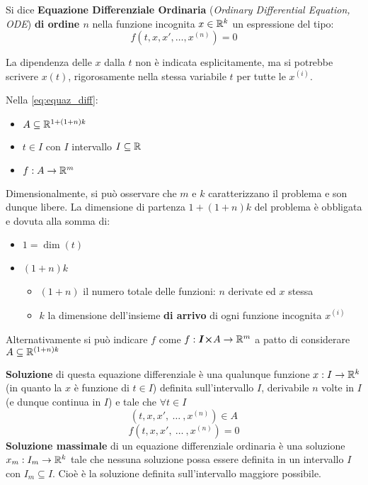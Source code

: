 \begin{definition}
	\label{def:equaz_diff}
	Si dice \textbf{Equazione Differenziale Ordinaria} (\textit{Ordinary Differential Equation, ODE}) \textbf{di ordine $n$} nella funzione incognita $x\in \mathbb{R}^k$ un espressione del tipo:
	\begin{equation}
		\label{eq:equaz_diff}
		f(t,x, x',\ldots,x^{(n)})=0
	\end{equation}
	\begin{note}
		La dipendenza delle $x$ dalla $t$ non è indicata esplicitamente, ma si potrebbe scrivere $x(t)$, rigorosamente nella stessa variabile $t$ per tutte le $x^{(i)}$.
	\end{note}
	Nella \cref{eq:equaz_diff}:
	\begin{itemize}[noitemsep]
		\item $A\subseteq \mathbb{R}^{1+(1+n)k}$
		\item $t\in I$ con $I$ intervallo $I \subseteq \mathbb{R}$
		\item $f: A \to \mathbb{R}^m$
	\end{itemize}
	Dimensionalmente, si può osservare che $m$ e $k$ caratterizzano il problema e son dunque libere. La dimensione di partenza $1+(1+n)k$ del problema è obbligata e dovuta alla somma di:
	\begin{itemize}[noitemsep]
		\item $1 = \dim(t)$
		\item $(1+n)k$
		\begin{itemize}[noitemsep]
			\item $(1+n)$ il numero totale delle funzioni: $n$ derivate ed $x$ stessa
			\item $k$ la dimensione dell'insieme \textbf{di arrivo} di ogni funzione incognita $x^{(i)}$
		\end{itemize}
	\end{itemize}
	\begin{note}
		Alternativamente si può indicare $f$ come $f: \boldsymbol{I \times} A \to \mathbb{R}^m$ a patto di considerare $A\subseteq \mathbb{R}^{(1+n)k}$
	\end{note}
	\textbf{Soluzione} di questa equazione differenziale è una qualunque funzione $x:I\to \mathbb{R}^k$ (in quanto la $x$ è funzione di $t \in I$) definita sull'intervallo $I$, derivabile $n$ volte in $I$ (e dunque continua in $I$) e tale che $\forall t\in I$
	\[(t,x, x',\:\dotsc\:,x^{(n)}) \in A\]
	\[f(t,x, x',\:\dotsc\:,x^{(n)})=0\]
	\textbf{Soluzione massimale} di un equazione differenziale ordinaria è una soluzione $x_m:I_m\to \mathbb{R}^k$ tale che nessuna soluzione possa essere definita in un intervallo $I$ con $I_m\subseteq I$. Cioè è la soluzione definita sull'intervallo maggiore possibile.


\end{definition}
